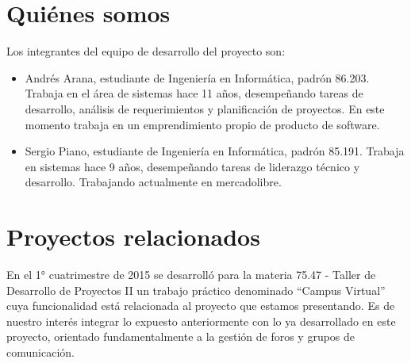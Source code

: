 \documentclass[a4paper,11pt]{article}
\begin{document}
\section*{{\Large{}Quiénes somos}}

Los integrantes del equipo de desarrollo del proyecto son:

\begin{itemize}
    \item Andrés Arana, estudiante de Ingeniería en Informática, padrón 86.203.
      Trabaja en el área de sistemas hace 11 años, desempeñando tareas de
      desarrollo, análisis de requerimientos y planificación de proyectos. En
      este momento trabaja en un emprendimiento propio de producto de software.

    \item Sergio Piano, estudiante de Ingeniería en Informática, padrón 85.191.
      Trabaja en sistemas hace 9 años, desempeñando tareas de liderazgo técnico
      y desarrollo. Trabajando actualmente en mercadolibre.
\end{itemize}

\section*{{\Large{}Proyectos relacionados}}

En el 1° cuatrimestre de 2015 se desarrolló para la materia 75.47 - Taller de
Desarrollo de Proyectos II un trabajo práctico denominado ``Campus Virtual''
cuya funcionalidad está relacionada al proyecto que estamos presentando. Es de
nuestro interés integrar lo expuesto anteriormente con lo ya desarrollado en
este proyecto, orientado fundamentalmente a la gestión de foros y grupos de
comunicación.
\end{document}
